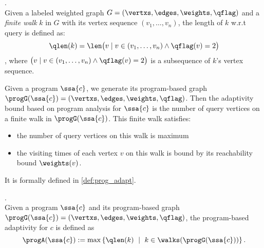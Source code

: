 %
%
\begin{defn}.
\\
Given a labeled weighted graph $G = (\vertxs, \edges, \weights, \qflag)$ and a \emph{finite walk} $k$ in $G$ with its vertex sequence $(v_1, \ldots, v_{n})$, the length of $k$ w.r.t query is defined as:
\[
	\qlen(k) = \len\big(
	v \mid v \in (v_1, \ldots, v_{n}) \land \qflag(v) = 2 \big)
\]
, where $\big(v \mid v \in (v_1, \ldots, v_{n}) \land \qflag(v) = 2 \big)$ is a subsequence of $k$'s vertex sequence.
\end{defn}
%
Given a program $\ssa{c}$, we generate its program-based graph 
$\progG(\ssa{c}) = (\vertxs, \edges, \weights, \qflag)$.
%
Then the adaptivity bound based on program analysis for $\ssa{c}$ is the number of query vertices on a finite walk in $\progG(\ssa{c})$. This finite walk satisfies:
\begin{itemize}
\item the number of query vertices on this walk is maximum
\item the visiting times of each vertex $v$ on this walk is bound by its reachability bound $\weights(v)$.
\end{itemize}
It is formally defined in \ref{def:prog_adapt}.
%
%
\begin{defn}
.
\label{def:prog_adapt}
\\
{
Given a program $\ssa{c}$ and its program-based graph 
$\progG(\ssa{c}) = (\vertxs, \edges, \weights, \qflag)$,
%
the program-based adaptivity for $c$ is defined as%
\[
\progA(\ssa{c}) 
:= \max
\left\{ \qlen(k)\ \mid \  k\in \walks(\progG(\ssa{c}))\right \}.
\]
}
\end{defn}  
%
